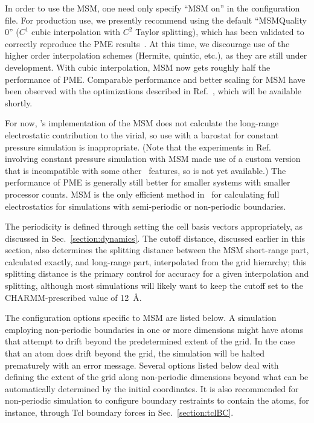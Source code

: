 In order to use the MSM, 
one need only specify ``MSM on'' in the configuration file. 
For production use, 
we presently recommend using the default 
``MSMQuality 0''
($C^1$ cubic interpolation with $C^2$ Taylor splitting), 
which has been validated to correctly reproduce
the PME results~\cite{HARD2015}. 
At this time, we discourage use of the higher order interpolation schemes 
(Hermite, quintic, etc.), 
as they are still under development. 
With cubic interpolation, MSM now gets roughly half the performance of PME. 
Comparable performance and better scaling for MSM 
have been observed with the optimizations described
in Ref.~\cite{HARD2015}, which will be available shortly. 

For now, \NAMD's implementation of the MSM
does not calculate the long-range electrostatic 
contribution to the virial, so use with a barostat for 
constant pressure simulation is inappropriate. 
(Note that the experiments in Ref.~\cite{HARD2015} 
involving constant pressure simulation with MSM 
made use of a custom version that is incompatible with 
some other \NAMD\ features, so is not yet available.) 
The performance of PME is generally still better for smaller systems 
with smaller processor counts. 
MSM is the only efficient method in \NAMD\ for calculating 
full electrostatics for simulations with semi-periodic or
non-periodic boundaries. 

The periodicity is defined through setting the cell basis vectors 
appropriately, as discussed in Sec.~\ref{section:dynamics}. 
The cutoff distance, discussed earlier in this section, 
also determines the splitting distance between the 
MSM short-range part, calculated exactly, and long-range part, 
interpolated from the grid hierarchy; 
this splitting distance is the primary control for 
accuracy for a given interpolation and splitting, 
although most simulations will likely want to keep the 
cutoff set to the CHARMM-prescribed value of 12~\AA. 

The configuration options specific to MSM are listed below. 
A simulation employing non-periodic boundaries in one or more 
dimensions might have atoms that attempt to drift beyond
the predetermined extent of the grid. 
In the case that an atom does drift beyond the grid, 
the simulation will be halted prematurely with an error message. 
Several options listed below deal with defining the extent of the 
grid along non-periodic dimensions beyond what can be automatically 
determined by the initial coordinates. 
It is also recommended for non-periodic simulation to 
configure boundary restraints to contain the atoms, for instance,
through Tcl boundary forces in Sec.~\ref{section:tclBC}. 



